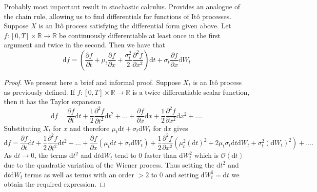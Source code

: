 \begin{lemma}[It\^{o}'s Lemma]
    Probably most important result in stochastic calculus. Provides an analogue of the chain rule,
    allowing us to find differentials for functions of It\^{o} processes. Suppose $X$ is an It\^{o}
    process satisfying the differential form given above. Let $f:[0,T]\times\mathbb{R}\rightarrow\mathbb{R}$
    be continuously differentiable at least once in the first argument and twice in the second.
    Then we have that
    \begin{equation}
        \mathrm df=\left(\frac{\partial f}{\partial t}+\mu_t\frac{\partial f}{\partial x}+\frac{\sigma_t^2}{2}\frac{\partial^2 f}{\partial x^2}\right)\mathrm dt + \sigma_t\frac{\partial f}{\partial x}\mathrm dW_t
    \end{equation}
\end{lemma}
\begin{proof}
    We present here a brief and informal proof. Suppose $X_t$ is an It\^{o} process
    as previously defined. If $f:[0,T]\times\mathbb{R}\rightarrow\mathbb{R}$ is a 
    twice differentiable scalar function, then it has the Taylor expansion
    \begin{equation}
        \mathrm df = \frac{\partial f}{\partial t}\mathrm dt+\frac{1}{2}\frac{\partial^2f}{\partial t^2}\mathrm dt^2+\dots+\frac{\partial f}{\partial x}\mathrm dx+\frac{1}{2}\frac{\partial^2f}{\partial x^2}\mathrm dx^2+\dots.
    \end{equation}
    Substituting $X_t$ for $x$ and therefore $\mu_t\mathrm dt + \sigma_t\mathrm dW_t$
    for $\mathrm dx$ gives
    \begin{equation}
        \mathrm df = \frac{\partial f}{\partial t}\mathrm dt+\frac{1}{2}\frac{\partial^2f}{\partial t^2}\mathrm dt^2+\dots+\frac{\partial f}{\partial x}(\mu_t\mathrm dt + \sigma_t\mathrm dW_t)+\frac{1}{2}\frac{\partial^2f}{\partial x^2}(\mu_t^2(\mathrm dt)^2 + 2\mu_t\sigma_t\mathrm dt\mathrm dW_t+ \sigma_t^2(\mathrm dW_t)^2)+\dots.
    \end{equation}
    As $\mathrm dt\rightarrow0$, the terms $\mathrm dt^2$ and $\mathrm dt\mathrm dW_t$ 
    tend to 0 faster than $\mathrm dW_t^2$ which is $\mathcal{O}(\mathrm dt)$ due to
    the quadratic variation of the Wiener process. Thus setting the $\mathrm dt^2$ 
    and $\mathrm dt\mathrm dW_t$ terms as well as terms with an order $>2$ to 0
    and setting $\mathrm dW_t^2=\mathrm dt$ we obtain the required expression.
\end{proof}

